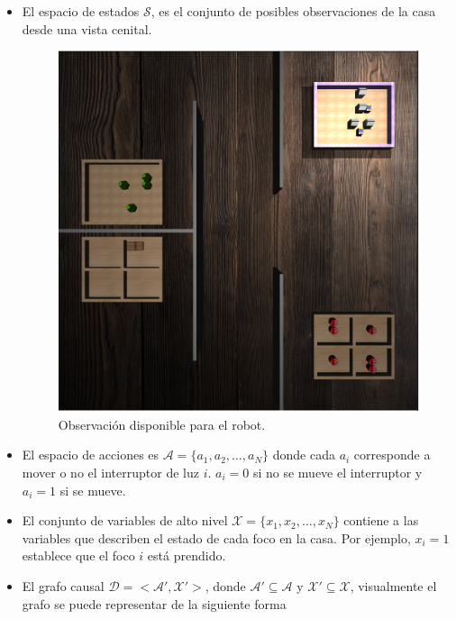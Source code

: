  \begin{itemize}
     \item El espacio de estados $\mathcal{S}$, es el conjunto de
     posibles observaciones de la casa desde una vista cenital.
     \begin{figure}[H]
         \centering
         \includegraphics[scale=0.17]{Chapter4/Figs/example_obs.png}
         \caption{Observación disponible para el robot.}
         \label{fig:obs-switches}
     \end{figure}
     \item El espacio de acciones es $\mathcal{A} = \{a_1, a_2, \dots, a_N\}$
     donde cada $a_i$ corresponde a mover o no el interruptor de luz $i$. $a_i = 0$ si no se mueve el interruptor y $a_i = 1$ si se mueve.
     \item El conjunto de variables de alto nivel $\mathcal{X} = \{x_1, x_2, \dots, x_N\}$ contiene
     a las variables que describen el estado de cada foco en la casa. Por ejemplo, $x_i = 1$ establece que el foco $i$ está prendido.
     \item El grafo causal $\mathcal{D} = <\mathcal{A'}, \mathcal{X'}>$, donde
     $\mathcal{A'} \subseteq \mathcal{A}$ y $\mathcal{X'} \subseteq \mathcal{X}$, visualmente el grafo se puede representar de la siguiente forma
     \begin{figure}[H]

\end{figure}
\end{itemize}
